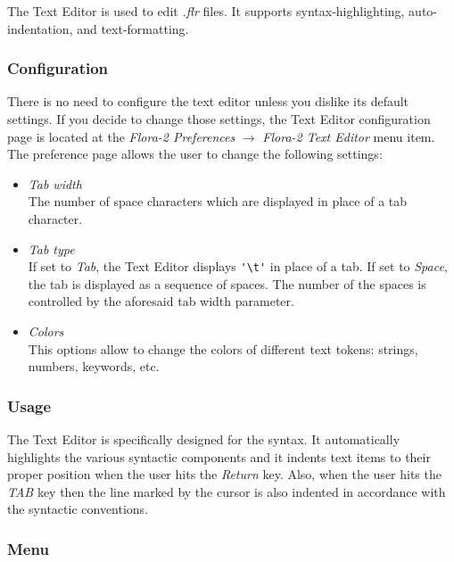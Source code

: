 The \FVIZ Text Editor is used to edit \emph{.flr} files. It supports
syntax-highlighting, auto-indentation, and text-formatting.

\subsubsection{Configuration}
\label{sec:texteditor_configuration}

There is no need to configure the text editor unless you dislike its
default settings. If you decide to change those settings,
the \FVIZ Text Editor configuration page is located at the \emph{Flora-2
  Preferences} $\rightarrow$ \emph{Flora-2 Text Editor} menu item.
The preference page allows the user to change the following settings:
\begin{itemize}
\item \emph{Tab width} \\
  The number of space characters which are displayed in place of a tab
  character.

\item  \emph{Tab type} \\
  If set to \emph{Tab}, the \FVIZ Text Editor displays \lstinline|'\t'| in
  place of a tab.  If set to \emph{Space}, the tab is displayed as a
  sequence of spaces. The number of the spaces is controlled by the aforesaid
  tab width parameter.


\item \emph{Colors}\\
  This options allow to change the colors of different text tokens:
  strings, numbers, keywords, etc.
\end{itemize}

\subsubsection{Usage}
\label{sec:texteditor_usage}

The \FVIZ Text Editor is specifically designed for the \FLORA
syntax. It automatically highlights the various syntactic components
and it indents text items to their proper position when the user hits the
\emph{Return} key.
Also, when the user hits the \emph{TAB} key then the line marked by the
cursor is also indented in accordance with the \FLORA syntactic conventions.

\subsubsection{Menu}
\label{sec:texteditor_menu}

